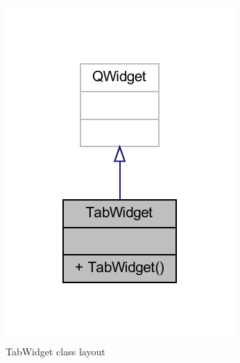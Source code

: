 \documentclass{article}
\begin{document}
\begin{figure}
    \includegraphics[]{classPdfs/classTabWidget.pdf}
    \caption{TabWidget class layout} \label{fig:TabWidget class layout}
\end{figure}
\end{document}
